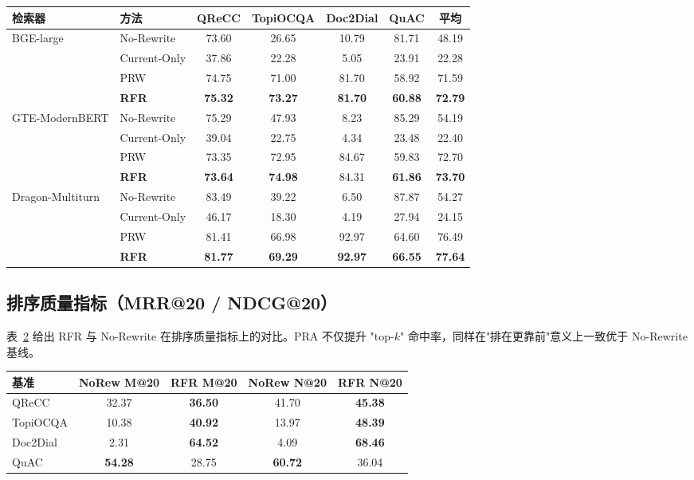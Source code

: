 \begin{table}[h]
\centering
{}
\label{tab:main_r20}
\small
\begin{tabular}{llccccc}
\toprule
检索器 & 方法 & QReCC & TopiOCQA & Doc2Dial & QuAC & 平均 \\
\midrule
\multirow{4}{*}{BGE-large}
 & No-Rewrite     & 73.60 & 26.65 & 10.79 & 81.71 & 48.19 \\
 & Current-Only   & 37.86 & 22.28 & 5.05 & 23.91 & 22.28 \\
 & PRW            & 74.75 & 71.00 & 81.70 & 58.92 & 71.59 \\
 & \textbf{RFR}   & \textbf{75.32} & \textbf{73.27} & \textbf{81.70} & \textbf{60.88} & \textbf{72.79} \\
\midrule
\multirow{4}{*}{GTE-ModernBERT}
 & No-Rewrite     & 75.29 & 47.93 & 8.23 & 85.29 & 54.19 \\
 & Current-Only   & 39.04 & 22.75 & 4.34 & 23.48 & 22.40 \\
 & PRW            & 73.35 & 72.95 & 84.67 & 59.83 & 72.70 \\
 & \textbf{RFR}   & \textbf{73.64} & \textbf{74.98} & 84.31 & \textbf{61.86} & \textbf{73.70} \\
\midrule
\multirow{4}{*}{Dragon-Multiturn}
 & No-Rewrite     & 83.49 & 39.22 & 6.50 & 87.87 & 54.27 \\
 & Current-Only   & 46.17 & 18.30 & 4.19 & 27.94 & 24.15 \\
 & PRW            & 81.41 & 66.98 & 92.97 & 64.60 & 76.49 \\
 & \textbf{RFR}   & \textbf{81.77} & \textbf{69.29} & \textbf{92.97} & \textbf{66.55} & \textbf{77.64} \\
\bottomrule
\end{tabular}
\end{table}

\subsection{排序质量指标（MRR@20 / NDCG@20）}

表~\ref{tab:main_mrr_ndcg} 给出 RFR 与 No-Rewrite 在排序质量指标上的对比。PRA 不仅提升 "top-$k$" 命中率，同样在"排在更靠前"意义上一致优于 No-Rewrite 基线。

\begin{table}[h]
\centering
{}
\label{tab:main_mrr_ndcg}
\small
\begin{tabular}{lcccc}
\toprule
基准 & NoRew M@20 & RFR M@20 & NoRew N@20 & RFR N@20 \\
\midrule
QReCC    & 32.37 & \textbf{36.50} & 41.70 & \textbf{45.38} \\
TopiOCQA & 10.38 & \textbf{40.92} & 13.97 & \textbf{48.39} \\
Doc2Dial &  2.31 & \textbf{64.52} &  4.09 & \textbf{68.46} \\
QuAC     & \textbf{54.28} & 28.75 & \textbf{60.72} & 36.04 \\
\bottomrule
\end{tabular}
\end{table}

